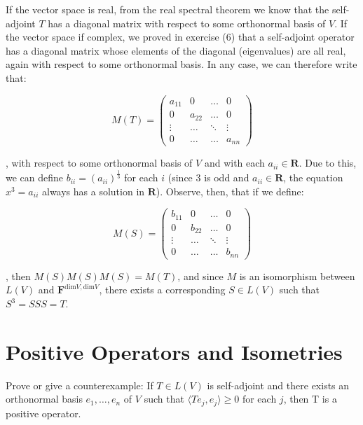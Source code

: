 \begin{solution}

    If the vector space is real, from the real spectral theorem we know that the self-adjoint $T$ has a diagonal matrix with respect to some orthonormal basis of $V$. If the vector space if complex, we proved in exercise (6) that a self-adjoint operator has a diagonal matrix whose elements of the diagonal (eigenvalues) are all real, again with respect to some orthonormal basis. In any case, we can therefore write that:

     $$M(T) = \begin{pmatrix} a_{11} & 0 & \ldots & 0 \\ 0 & a_{22} & \ldots & 0 \\ \vdots & \ldots & \ddots  & \vdots \\ 0 & \ldots & \ldots & a_{nn} \end{pmatrix}$$

     , with respect to some orthonormal basis of $V$ and with each $a_{ii} \in \mathbf{R}$. Due to this, we can define $b_{ii} = (a_{ii})^{\frac{1}{3}}$ for each $i$ (since 3 is odd and $a_{ii} \in \mathbf{R}$, the equation $x^3 = a_{ii}$ always has a solution in $\mathbf{R}$). Observe, then, that if we define:
     
     $$M(S) = \begin{pmatrix} b_{11} & 0 & \ldots & 0 \\ 0 & b_{22} & \ldots & 0 \\ \vdots & \ldots & \ddots  & \vdots \\ 0 & \ldots & \ldots & b_{nn} \end{pmatrix}$$

     , then $M(S)M(S)M(S) = M(T)$, and since $M$ is an isomorphism between $L(V)$ and $\mathbf{F}^{\text{dim} V, \text{dim} V}$, there exists a corresponding $S \in L(V)$ such that $S^3 = SSS = T$.
\end{solution}

\section{Positive Operators and Isometries}

\begin{exercise}{1}
    Prove or give a counterexample: If $T \in L(V)$ is self-adjoint and there exists an orthonormal basis $e_1, \ldots, e_n$ of $V$ such that $\langle Te_j, e_j \rangle \geq 0$ for each $j$, then T is a positive operator.
\end{exercise}

